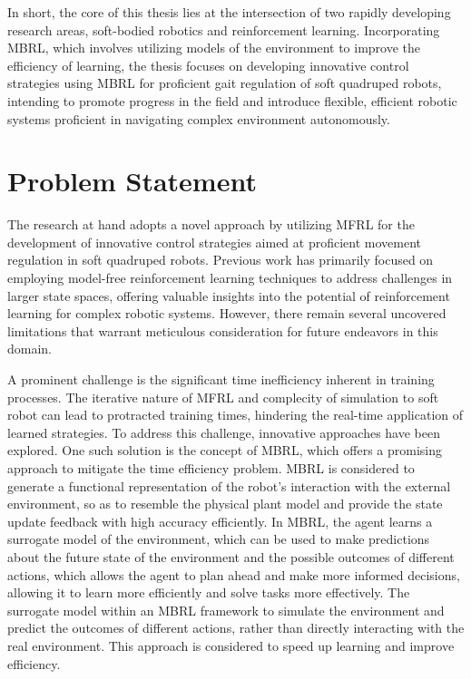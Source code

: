 In short, the core of this thesis lies at the intersection of two rapidly developing research areas, soft-bodied robotics and reinforcement learning. Incorporating \ac{MBRL}, which involves utilizing models of the environment to improve the efficiency of learning, the thesis focuses on developing innovative control strategies using \ac{MBRL} for proficient gait regulation of soft quadruped robots, intending to promote progress in the field and introduce flexible, efficient robotic systems proficient in navigating complex environment autonomously.

\section{Problem Statement}
The research at hand adopts a novel approach by utilizing \ac{MFRL} for the development of innovative control strategies aimed at proficient movement regulation in soft quadruped robots\cite{jiSynthesizingOptimalGait2022}. Previous work has primarily focused on employing model-free reinforcement learning techniques to address challenges in larger state spaces, offering valuable insights into the potential of reinforcement learning for complex robotic systems. However, there remain several uncovered limitations that warrant meticulous consideration for future endeavors in this domain.

A prominent challenge is the significant time inefficiency inherent in training processes. The iterative nature of \ac{MFRL} and complecity of simulation to soft robot can lead to protracted training times, hindering the real-time application of learned strategies\cite{jiSynthesizingOptimalGait2022}. To address this challenge, innovative approaches have been explored. One such solution is the concept of \ac{MBRL}, which offers a promising approach to mitigate the time efficiency problem. \ac{MBRL} is considered to generate a functional representation of the robot’s interaction with the external environment, so as to resemble the physical plant model and provide the state update feedback with high accuracy efficiently\cite{rayModelBasedReinforcementLearning2010}. In \ac{MBRL}, the agent learns a surrogate model of the environment, which can be used to make predictions about the future state of the environment and the possible outcomes of different actions, which allows the agent to plan ahead and make more informed decisions, allowing it to learn more efficiently and solve tasks more effectively\cite{polydorosSurveyModelBasedReinforcement2017}. The surrogate model within an MBRL framework to simulate the environment and predict the outcomes of different actions, rather than directly interacting with the real environment. This approach is considered to speed up learning and improve efficiency.

